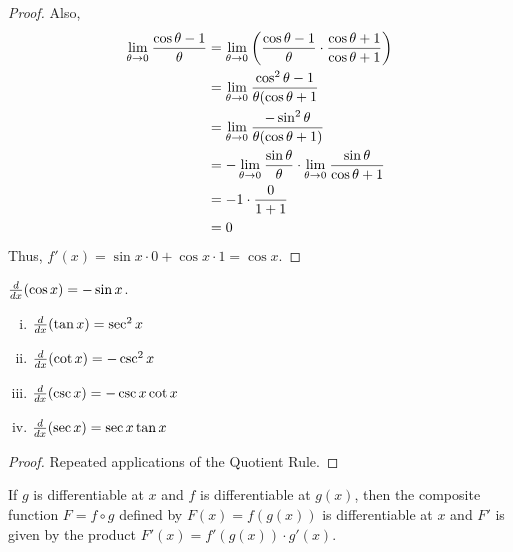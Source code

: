 \documentclass[a4paper,8pt]{article}
\begin{document}
\begin{outline}
\begin{proof}
      Also,
      \begin{align*}
        \lim\limits_{\theta\rightarrow 0^{}}\frac{\cos{\theta}-1}{\theta}
          &= \lim\limits_{\theta\rightarrow 0^{}}\left(\frac{\cos{\theta}-1}{\theta}\cdot\frac{\cos{\theta}+1}{\cos{\theta}+1}\right)\\
          &= \lim\limits_{\theta\rightarrow 0^{}}\frac{\cos^2\theta-1}{\theta(\cos{\theta}+1}\\
          &= \lim\limits_{\theta\rightarrow 0^{}}\frac{-\sin^2\theta}{\theta(\cos{\theta}+1)}\\
          &= -\lim\limits_{\theta\rightarrow 0^{}}\frac{\sin{\theta}}{\theta}\cdot\lim\limits_{\theta\rightarrow 0^{}}\frac{\sin{\theta}}{\cos{\theta}+1}\\
          &= -1\cdot\frac{0}{1+1}\\
          &= 0
      \end{align*}
      Thus, \(f'(x) = \sin{x}\cdot 0 + \cos{x}\cdot 1 = \cos{x}\).
    \end{proof}

    \(\frac{d}{dx}(\cos{x}) = -\sin{x}\).

    \begin{enumerate}[i.]
      \item \(\frac{d}{dx}(\tan{x})=\sec^2{x}\)
      \item \(\frac{d}{dx}(\cot{x})=-\csc^2{x}\)
      \item \(\frac{d}{dx}(\csc{x})=-\csc{x}\cot{x}\)
      \item \(\frac{d}{dx}(\sec{x})=\sec{x}\tan{x}\)
    \end{enumerate}

    \begin{proof}
      Repeated applications of the Quotient Rule.
    \end{proof}

    If \(g\) is differentiable at \(x\) and \(f\) is differentiable at \(g(x)\), then the composite
    function \(F=f\circ g\) defined by \(F(x)=f(g(x))\) is differentiable at \(x\) and \(F'\) is given
    by the product \(F'(x)=f'(g(x))\cdot g'(x)\).


\end{outline}
\end{document}
